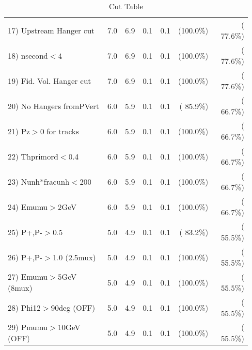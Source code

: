 \begin{table}[h!]
\begin{tabular}{||l||r|r|r|r|r|r||}
 17) Upstream Hanger cut  &          7.0 &          6.9 &          0.1 &          0.1 & (100.0\%) & ( 77.6\%) \\
 18) nsecond$<$4          &          7.0 &          6.9 &          0.1 &          0.1 & (100.0\%) & ( 77.6\%) \\
 19) Fid. Vol. Hanger cut &          7.0 &          6.9 &          0.1 &          0.1 & (100.0\%) & ( 77.6\%) \\
 20) No Hangers fromPVert &          6.0 &          5.9 &          0.1 &          0.1 & ( 85.9\%) & ( 66.7\%) \\
 21) Pz$>$0 for tracks    &          6.0 &          5.9 &          0.1 &          0.1 & (100.0\%) & ( 66.7\%) \\
 22) Thprimord$<$0.4      &          6.0 &          5.9 &          0.1 &          0.1 & (100.0\%) & ( 66.7\%) \\
 23) Nunh*fracunh$<$200   &          6.0 &          5.9 &          0.1 &          0.1 & (100.0\%) & ( 66.7\%) \\
 24) Emumu$>$2GeV         &          6.0 &          5.9 &          0.1 &          0.1 & (100.0\%) & ( 66.7\%) \\
 25) P+,P-$>$0.5          &          5.0 &          4.9 &          0.1 &          0.1 & ( 83.2\%) & ( 55.5\%) \\
 26) P+,P-$>$1.0 (2.5mux) &          5.0 &          4.9 &          0.1 &          0.1 & (100.0\%) & ( 55.5\%) \\
 27) Emumu$>$5GeV  (8mux) &          5.0 &          4.9 &          0.1 &          0.1 & (100.0\%) & ( 55.5\%) \\
 28) Phi12$>$90deg  (OFF) &          5.0 &          4.9 &          0.1 &          0.1 & (100.0\%) & ( 55.5\%) \\
 29) Pmumu$>$10GeV  (OFF) &          5.0 &          4.9 &          0.1 &          0.1 & (100.0\%) & ( 55.5\%) \\
 \hline
 \hline
 \end{tabular}
 \caption{Cut Table           }
 \label{tab-cutcohjpsi-mumu_anuecc}
 \end{table}

